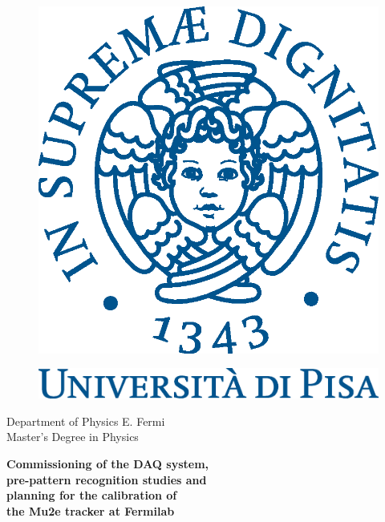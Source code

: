 \begin{titlepage}
    \begin{center}
\begin{figure}[!htb]
    \centering
    \includegraphics[keepaspectratio=true,scale=0.4]{figures/eps/cherubinFrontespizio.eps}
\end{figure}
\begin{figure}[!htb]
    \centering
    \includegraphics[keepaspectratio=true,scale=0.45]{figures/eps/logo_pant541.eps}
\end{figure}

    \Large{Department of Physics E. Fermi}
    \vspace{5mm}
    \\ 
    \Large{Master's Degree in Physics}
\end{center}

\vspace{15mm}
\begin{center}
    {\LARGE{\bf Commissioning of the DAQ system,\\ \vspace{3mm} pre-pattern recognition studies and\\ \vspace{5mm} planning for the calibration of\\ \vspace{7mm} the Mu2e tracker at Fermilab}}
\end{center}
\vspace{25mm}


\end{titlepage}
